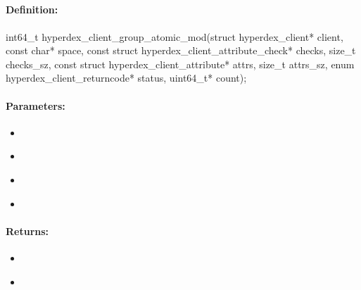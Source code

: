 \pagebreak
\subsection{}
\label{api:c:group_atomic_mod}


\paragraph{Definition:}
\begin{ccode}
int64_t hyperdex_client_group_atomic_mod(struct hyperdex_client* client,
        const char* space,
        const struct hyperdex_client_attribute_check* checks, size_t checks_sz,
        const struct hyperdex_client_attribute* attrs, size_t attrs_sz,
        enum hyperdex_client_returncode* status,
        uint64_t* count);
\end{ccode}

\paragraph{Parameters:}
\begin{itemize}[noitemsep]
\item {}\\

\item {}\\

\item {}\\

\item {}\\

\end{itemize}

\paragraph{Returns:}
\begin{itemize}[noitemsep]
\item {}\\

\item {}\\

\end{itemize}

